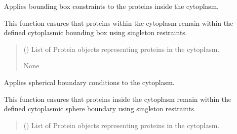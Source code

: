\documentclass[letterpaper,10pt,english]{sphinxmanual}
\begin{document}
\begin{fulllineitems}
\begin{fulllineitems}
\end{fulllineitems}


\begin{fulllineitems}
\label{\detokenize{src:src.System_Class.System.apply_cytoplasm_box_boundary_conditions}}
\pysigstartsignatures
{}
\pysigstopsignatures
\sphinxAtStartPar
Applies bounding box constraints to the proteins inside the cytoplasm.

\sphinxAtStartPar
This function ensures that proteins within the cytoplasm remain within
the defined cytoplasmic bounding box using singleton restraints.
\begin{quote}\begin{description}
\sphinxAtStartPar
{} () \textendash{} List of Protein objects representing proteins in the cytoplasm.

\sphinxAtStartPar
None

\end{description}\end{quote}

\end{fulllineitems}


\begin{fulllineitems}
\label{\detokenize{src:src.System_Class.System.apply_cytoplasm_sphere_boundary_conditions}}
\pysigstartsignatures
{}
\pysigstopsignatures
\sphinxAtStartPar
Applies spherical boundary conditions to the cytoplasm.

\sphinxAtStartPar
This function ensures that proteins inside the cytoplasm remain within the
defined cytoplasmic sphere boundary using singleton restraints.
\begin{quote}\begin{description}
\sphinxAtStartPar
{} () \textendash{} List of Protein objects representing proteins in the cytoplasm.


\end{description}
\end{quote}
\end{fulllineitems}
\end{fulllineitems}
\end{document}
